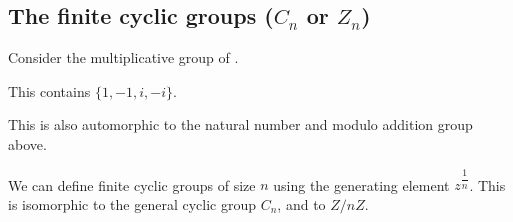 
\subsection{The finite cyclic groups (\(C_n\) or \(Z_n\))}

Consider the multiplicative group of \(< i >\).

This contains \(\{1,-1,i,-i \} \).

This is also automorphic to the natural number and modulo addition group above.

We can define finite cyclic groups of size \(n\) using the generating element \(z^{\dfrac{1}{n}}\). This is isomorphic to the general cyclic group \(C_n\), and to \(Z/nZ\).

